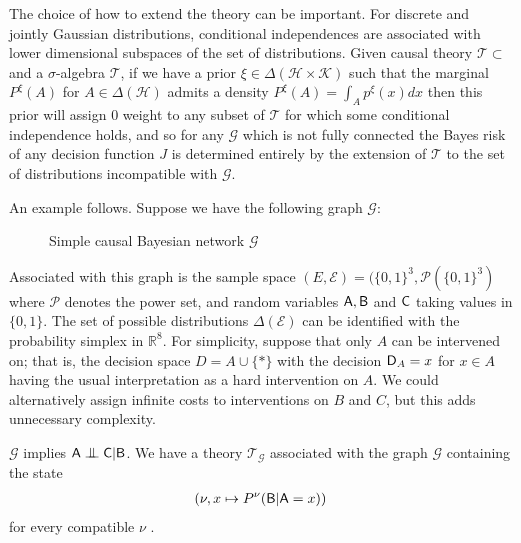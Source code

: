 The choice of how to extend the theory can be important. For discrete and jointly Gaussian distributions, conditional independences are associated with lower dimensional subspaces of the set of distributions\cite{meek_strong_1995}. Given causal theory $\mathscr{T}\subset$ and a $\sigma$-algebra $\mathcal{T}$, if we have a prior $\xi\in \Delta(\mathscr{H}\times \mathscr{K})$ such that the marginal $P^\xi(A)$ for $A\in \Delta(\mathscr{H})$ admits a density $P^\xi(A) = \int_A p^\xi(x)dx$ then this prior will assign 0 weight to any subset of $\mathscr{T}$ for which some conditional independence holds, and so for any $\mathcal{G}$ which is not fully connected the Bayes risk of any decision function $J$ is determined entirely by the extension of $\mathscr{T}$ to the set of distributions incompatible with $\mathcal{G}$.

An example follows. Suppose we have the following graph $\mathcal{G}$:

\begin{figure}
    \centering
    \caption{Simple causal Bayesian network $\mathcal{G}$}
    \label{fig:simple_cbn}
\end{figure}

Associated with this graph is the sample space $(E,\mathcal{E})=(\{0,1\}^3,\mathscr{P}(\{0,1\}^3)$ where $\mathscr{P}$ denotes the power set, and random variables $\mathsf{A},\mathsf{B}$ and $\mathsf{C}$ taking values in $\{0,1\}$. The set of possible distributions $\Delta(\mathcal{E})$ can be identified with the probability simplex in $\mathbb{R}^8$. For simplicity, suppose that only $A$ can be intervened on; that is, the decision space $D=A\cup\{*\}$ with the decision $\mathsf{D}_A=x$ for $x\in A$ having the usual interpretation as a hard intervention on $A$. We could alternatively assign infinite costs to interventions on $B$ and $C$, but this adds unnecessary complexity.

$\mathcal{G}$ implies $\RV{A}\CI \RV{C} | \RV{B}$. We have a theory $\mathscr{T}_{\mathcal{G}}$ associated with the graph $\mathcal{G}$ containing the state
\begin{align}
    (\nu,x\mapsto P^\nu(\mathsf{B}|\mathsf{A}=x) ) \label{eq:ocbn}
\end{align}
for every compatible $\nu$ . 

